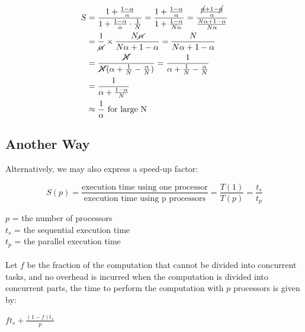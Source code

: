 \documentclass[a4paper]{article}
\begin{document}
\begin{Large}
\begin{align*}
S &= \frac{1 + \frac{1 - \alpha}{\alpha}}{1 + \frac{1 - \alpha}{\alpha} \cdot \frac{1}{N}} = \frac{1 + \frac{1 - \alpha}{\alpha}}{1 + \frac{1 - \alpha}{N\alpha}} = \frac{\frac{\cancel{\alpha} + 1 - \cancel{\alpha}}{\alpha}}{\frac{N\alpha + 1 - \alpha}{N\alpha}} \\
&= \frac{1}{\cancel{\alpha}} \times \frac{N\cancel{\alpha}}{N\alpha + 1 - \alpha} = \frac{N}{N\alpha + 1 - \alpha} \\
&= \frac{\cancel{N}}{\cancel{N}(\alpha + \frac{1}{N} - \frac{\alpha}{N})} = \frac{1}{\alpha + \frac{1}{N} - \frac{\alpha}{N}} \\
&= \frac{1}{\alpha + \frac{1 - \alpha}{N}} \\
&\approx \frac{1}{\alpha} \text{ for large N}
\end{align*}
\end{Large}


\pagebreak

\subsection{Another Way}
Alternatively, we may also express a speed-up factor:

\[
S(p) = \frac{\text{execution time using one processor}}{\text{execution time using p processors}} = \frac{T(1)}{T(p)} = \frac{t_s}{t_p}
\]

\noindent
$p$ = the number of processors
\\
$t_s$ = the sequential execution time
\\
$t_p$ = the parallel execution time
\\
\\
\noindent
Let $f$ be the fraction of the computation that cannot be divided into concurrent tasks, and no overhead is incurred when the computation is divided into concurrent parts, the time to perform the computation with $p$ processors is given by:

\begin{center}
{\Large $ft_s + \frac{(1 - f)t_s}{p}$}
\end{center}
\end{document}
